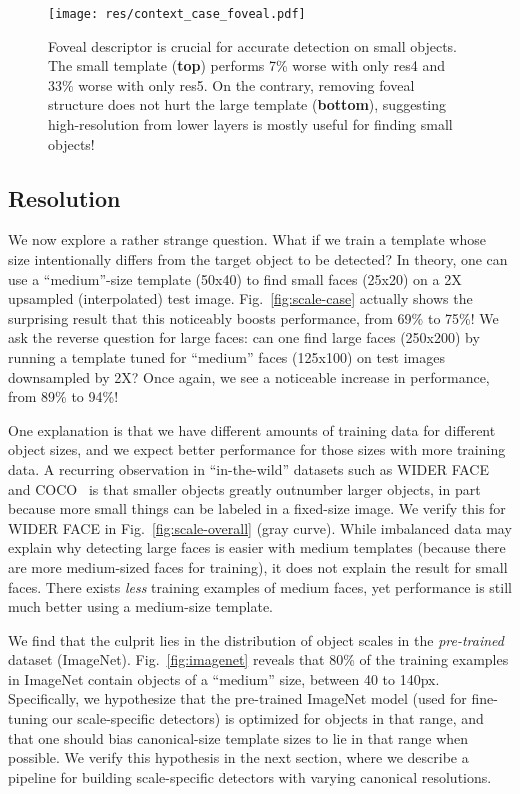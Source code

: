 \documentclass[10pt,twocolumn,letterpaper]{article}
\begin{document}
\begin{figure}
  \centering
  \texttt{[image: res/context\_case\_foveal.pdf]}
  \caption{ Foveal descriptor is crucial for accurate detection on small objects. The small template ({\bf top}) performs 7\% worse with only res4 and 33\% worse with only res5. On the contrary, removing foveal structure does not hurt the large template ({\bf bottom}), suggesting high-resolution from lower layers is mostly useful for finding small objects!  }
  \label{fig:context-case-foveal}  
\end{figure}

\subsection{Resolution}
\label{sec:resolution}

We now explore a rather strange question. What if we train a template whose size intentionally differs from the target object to be detected? In theory, one can use a ``medium''-size template (50x40) to find small faces (25x20) on a 2X upsampled (interpolated) test image. Fig.~\ref{fig:scale-case} actually shows the surprising result that this noticeably boosts performance, from 69\% to 75\%!  We ask the reverse question for large faces: can one find large faces (250x200) by running a template tuned for ``medium'' faces (125x100) on test images downsampled by 2X? Once again, we see a noticeable increase in performance, from 89\% to 94\%!

One explanation is that we have different amounts of training data for different object sizes, and we expect better performance for those sizes with more training data. A recurring observation in ``in-the-wild'' datasets such as WIDER FACE and COCO~\cite{lin2014microsoft} is that smaller objects greatly outnumber larger objects, in part because more small things can be labeled in a fixed-size image. We verify this for WIDER FACE in Fig.~\ref{fig:scale-overall} (gray curve). While imbalanced data may explain why detecting large faces is easier with medium templates (because there are more medium-sized faces for training), it does not explain the result for small faces. There exists {\em less} training examples of medium faces, yet performance is still much better using a medium-size template.

We find that the culprit lies in the distribution of object scales in the {\em pre-trained} dataset (ImageNet). Fig.~\ref{fig:imagenet} reveals that 80\% of the training examples in ImageNet contain objects of a ``medium'' size, between 40 to 140px. Specifically, we hypothesize that the pre-trained ImageNet model (used for fine-tuning our scale-specific detectors) is optimized for objects in that range, and that one should bias canonical-size template sizes to lie in that range when possible. We verify this hypothesis in the next section, where we describe a pipeline for building scale-specific detectors with varying canonical resolutions.
\end{document}
